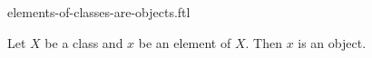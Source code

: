 \documentclass{stex}
\begin{document}
\begin{smodule}{elements-of-classes-are-objects.ftl}
  \begin{flemma*}
    Let $X$ be a class and $x$ be an element of $X$.
    Then $x$ is an object.
  \end{flemma*}
\end{smodule}
\end{document}
